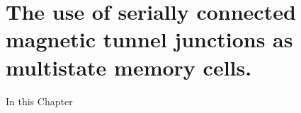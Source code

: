 \chapter{The use of serially connected magnetic tunnel junctions as multistate memory cells.}\label{serspin_mem}


\indent In this Chapter

\cleardoublepage



\cleardoublepage